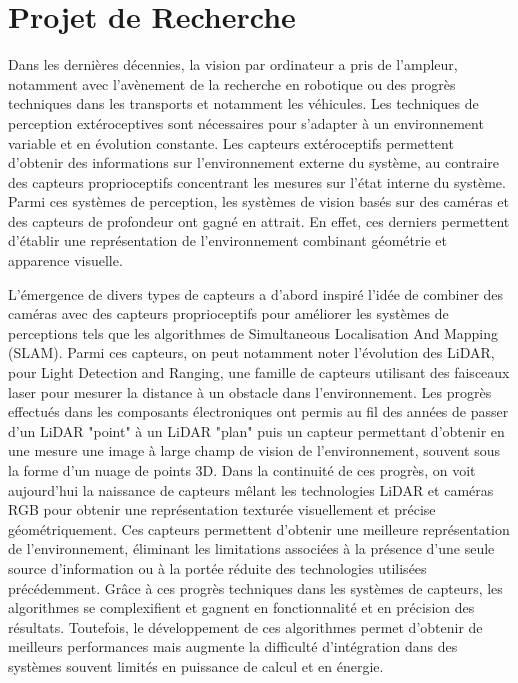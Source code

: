 \section{Projet de Recherche}\label{projet-recherche}

Dans les dernières décennies, la vision par ordinateur a pris de l'ampleur, notamment avec l'avènement de la recherche en robotique ou des progrès techniques dans les transports et notamment les véhicules. Les techniques de perception extéroceptives sont nécessaires pour s'adapter à un environnement variable et en évolution constante. Les capteurs extéroceptifs permettent d'obtenir des informations sur l'environnement externe du système, au contraire des capteurs proprioceptifs concentrant les mesures sur l'état interne du système.
Parmi ces systèmes de perception, les systèmes de vision basés sur des caméras et des capteurs de profondeur ont gagné en attrait. En effet, ces derniers permettent d'établir une représentation de l'environnement combinant géométrie et apparence visuelle.

L'émergence de divers types de capteurs a d'abord inspiré l'idée de combiner des caméras avec des capteurs proprioceptifs pour améliorer les systèmes de perceptions tels que les algorithmes de Simultaneous Localisation And Mapping (SLAM). Parmi ces capteurs, on peut notamment noter l'évolution des LiDAR, pour Light Detection and Ranging, une famille de capteurs utilisant des faisceaux laser pour mesurer la distance à un obstacle dans l'environnement. Les progrès effectués dans les composants électroniques ont permis au fil des années de passer d'un LiDAR "point" à un LiDAR "plan" puis un capteur permettant d'obtenir en une mesure une image à large champ de vision de l'environnement, souvent sous la forme d'un nuage de points 3D. Dans la continuité de ces progrès, on voit aujourd'hui la naissance de capteurs mêlant les technologies LiDAR et caméras RGB pour obtenir une représentation texturée visuellement et précise géométriquement. Ces capteurs permettent d'obtenir une meilleure représentation de l'environnement, éliminant les limitations associées à la présence d'une seule source d'information ou à la portée réduite des technologies utilisées précédemment. Grâce à ces progrès techniques dans les systèmes de capteurs, les algorithmes se complexifient et gagnent en fonctionnalité et en précision des résultats. Toutefois, le développement de ces algorithmes permet d'obtenir de meilleurs performances mais augmente la difficulté d'intégration dans des systèmes souvent limités en puissance de calcul et en énergie.

